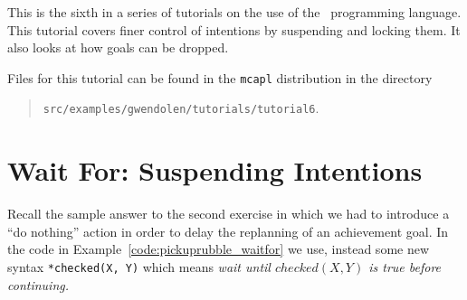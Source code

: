 This is the sixth in a series of tutorials on the use of the
\gwendolen\ programming language.  This tutorial covers finer control
of intentions by suspending and locking them.  It also looks at how
goals can be
dropped.  

Files for this tutorial can be found in the \texttt{mcapl}
distribution in the directory  
\begin{quote}
\texttt{src/examples/gwendolen/tutorials/tutorial6}.
\end{quote}

\section{Wait For: Suspending Intentions}

Recall the sample answer to the second exercise
 in which we had
to introduce a ``do nothing'' action in order to delay the replanning
of an achievement goal.  In the code in
Example~\ref{code:pickuprubble_waitfor} we use, instead some new
syntax \lstinline{*checked(X, Y)} which means \emph{wait until
  $checked(X, Y)$ is true before
  continuing.} 

